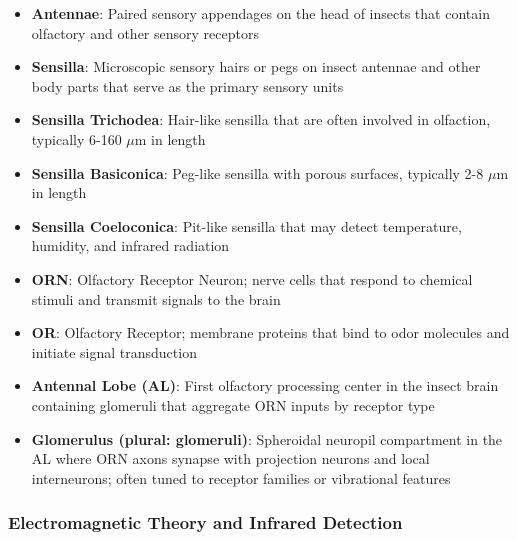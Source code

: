 \documentclass[
  13pt,
  a4paperpaper,
  12pt]{article}
\providecommand{\tightlist}{%
  \setlength{\itemsep}{0pt}\setlength{\parskip}{0pt}}
\begin{document}
\begin{itemize}
\tightlist
\item
  \textbf{Antennae}: Paired sensory appendages on the head of insects
  that contain olfactory and other sensory receptors
\item
  \textbf{Sensilla}: Microscopic sensory hairs or pegs on insect
  antennae and other body parts that serve as the primary sensory units
\item
  \textbf{Sensilla Trichodea}: Hair-like sensilla that are often
  involved in olfaction, typically 6-160 \(\mu\mathrm{m}\) in length
\item
  \textbf{Sensilla Basiconica}: Peg-like sensilla with porous surfaces,
  typically 2-8 \(\mu\mathrm{m}\) in length
\item
  \textbf{Sensilla Coeloconica}: Pit-like sensilla that may detect
  temperature, humidity, and infrared radiation
\item
  \textbf{ORN}: Olfactory Receptor Neuron; nerve cells that respond to
  chemical stimuli and transmit signals to the brain
\item
  \textbf{OR}: Olfactory Receptor; membrane proteins that bind to odor
  molecules and initiate signal transduction
\item
  \textbf{Antennal Lobe (AL)}: First olfactory processing center in the
  insect brain containing glomeruli that aggregate ORN inputs by
  receptor type
\item
  \textbf{Glomerulus (plural: glomeruli)}: Spheroidal neuropil
  compartment in the AL where ORN axons synapse with projection neurons
  and local interneurons; often tuned to receptor families or
  vibrational features
\end{itemize}

\subsubsection{Electromagnetic Theory and Infrared
Detection}\label{electromagnetic-theory-and-infrared-detection}
\end{document}
